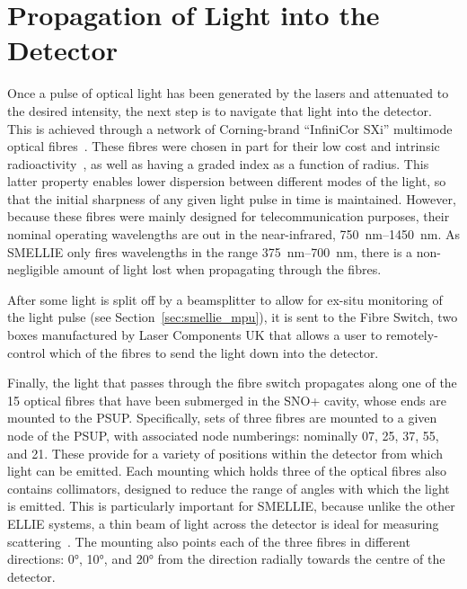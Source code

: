 \section{Propagation of Light into the Detector}\label{sec:smellie_fibres}
Once a pulse of optical light has been generated by the lasers and attenuated to the desired intensity, the next step is to navigate that light into the detector. This is achieved through a network of Corning-brand ``InfiniCor SXi'' multimode optical fibres~\cite{corningCorningInfinicor502007}. %
These fibres were chosen in part for their low cost and intrinsic radioactivity~\cite{clarkELLIEFibreRadioactivity2011}, %
as well as having a graded index as a function of radius. This latter property enables lower dispersion between different modes of the light, so that the initial sharpness of any given light pulse in time is maintained. However, because these fibres were mainly designed for telecommunication purposes, their nominal operating wavelengths are out in the near-infrared, \SIrange{750}{1450}{\nm}. As SMELLIE only fires wavelengths in the range \SIrange{375}{700}{\nm}, there is a non-negligible amount of light lost when propagating through the fibres.

After some light is split off by a beamsplitter to allow for ex-situ monitoring of the light pulse (see Section~\ref{sec:smellie_mpu}), it is sent to the Fibre Switch, two boxes manufactured by Laser Components UK that allows a user to remotely-control which of the fibres to send the light down into the detector.

Finally, the light that passes through the fibre switch propagates along one of the 15 optical fibres that have been submerged in the SNO+ cavity, whose ends are mounted to the PSUP. Specifically, sets of three fibres are mounted to a given node of the PSUP, with associated node numberings: nominally 07, 25, 37, 55, and 21. These provide for a variety of positions within the detector from which light can be emitted. Each mounting which holds three of the optical fibres also contains collimators, designed to reduce the range of angles with which the light is emitted. This is particularly important for SMELLIE, because unlike the other ELLIE systems, a thin beam of light across the detector is ideal for measuring scattering~\cite{majumdarMeasurementOpticalScattering2015}. %
The mounting also points each of the three fibres in different directions: \ang{0}, \ang{10}, and \ang{20} from the direction radially towards the centre of the detector.

